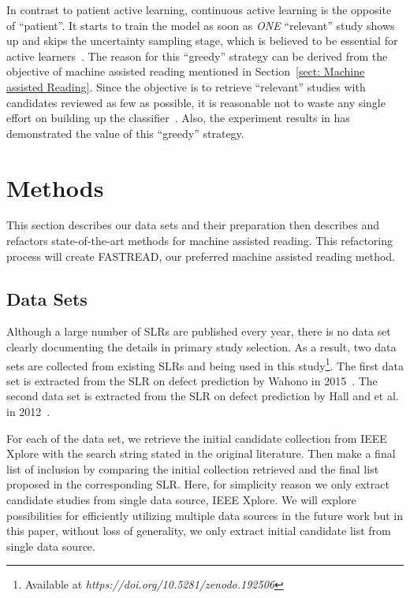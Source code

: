 \documentclass[final,twocolumn,5p]{elsarticle}
\theoremstyle{break}
\begin{document}
In contrast to patient active learning, continuous active learning is the opposite of ``patient''. It starts to train the model as soon as \textit{ONE} ``relevant'' study shows up and skips the uncertainty sampling stage, which is believed to be essential for active learners~\cite{settles2012active}. The reason for this ``greedy'' strategy can be derived from the objective of machine assisted reading mentioned in Section~\ref{sect: Machine assisted Reading}. Since the objective is to retrieve ``relevant'' studies with candidates reviewed as few as possible, it is reasonable not to waste any single effort on building up the classifier~\cite{cormack2014evaluation,tredennick2015}. Also, the experiment results in \cite{cormack2014evaluation} has demonstrated the value of this ``greedy'' strategy.











\section{Methods}
\label{sect: Method}

This section describes our data sets and their preparation then describes and refactors state-of-the-art methods for machine assisted reading.
This refactoring process will create FASTREAD, our preferred machine assisted reading
method. 

\subsection{Data Sets}
\label{sect: Data Sets}

Although a large number of SLRs are published every year, there is no data set clearly documenting the details in primary study selection. As a result, two data sets are collected from existing SLRs and being used in this study\footnote{Available at \textit{https://doi.org/10.5281/zenodo.192506}}. The first data set is extracted from the SLR on defect prediction by Wahono in 2015~\cite{wahono2015systematic}. The second data set is extracted from the SLR on defect prediction by Hall and et al. in 2012~\cite{hall2012systematic}. 

For each of the data set, we retrieve the initial candidate collection from IEEE Xplore with the search string stated in the original literature. Then make a final list of inclusion by comparing the initial collection retrieved and the final list proposed in the corresponding SLR. Here, for simplicity reason we only extract candidate studies from single data source, IEEE Xplore. We will explore possibilities for efficiently utilizing multiple data sources in the future work but in this paper, without loss of generality, we only extract initial candidate list from single data source. 
\end{document}
